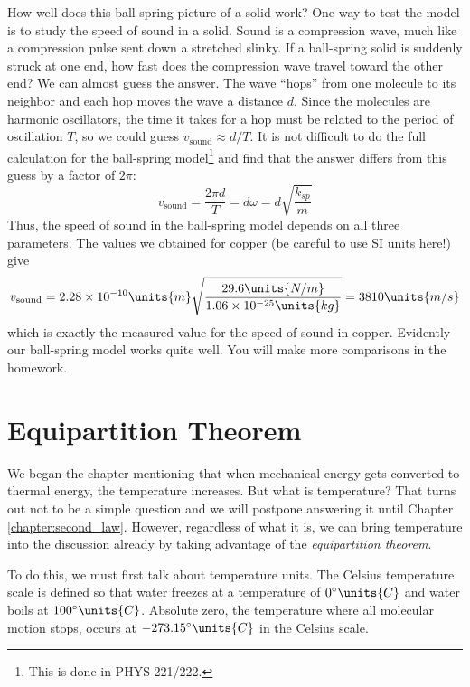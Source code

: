 How well does this ball-spring picture of a solid work? 
One way to test the model is to study the speed of sound in a
solid.  Sound is a compression wave, much like a compression pulse
sent down a stretched slinky.  If a ball-spring solid is suddenly
struck at one end, how fast does the compression wave travel toward
the other end?  We can almost guess the answer.  The wave ``hops''
from one molecule to its neighbor and each hop moves the wave a
distance $d$.  Since the molecules are harmonic oscillators, the time
it takes for a hop must be related to the period of oscillation $T$,
so we could guess $v_\text{sound} \approx d/T$.  It is not difficult
to do the full calculation for the ball-spring model\footnote{This is
  done in PHYS 221/222.} and find that the answer differs from this
guess by a factor of $2\pi$:
\begin{equation}
v_\text{sound} = \frac{2\pi d}{T} = d\omega  = d\sqrt{\frac{k_{sp}}{m}}
\end{equation}
Thus, the speed of sound in the ball-spring model depends on all three
parameters.  The values we obtained for copper (be careful to use SI
units here!) give
\begin{equation}
 v_\text{sound} = 2.28\times
 10^{-10}\units{m}\sqrt{\frac{29.6\units{N/m}}{1.06\times
     10^{-25}\units{kg}}} = 3810\units{m/s}
\end{equation}
which is exactly the measured value for the speed of sound in copper.
Evidently our ball-spring model works quite well.  You will make more
comparisons in the homework.

\section{Equipartition Theorem}

We began the chapter mentioning that when mechanical energy gets
converted to thermal energy, the temperature increases.  But what is
temperature?  That turns out not to be a simple question and we will
postpone answering it until Chapter \ref{chapter:second_law}.
However, regardless of what it is, we can bring temperature into the
discussion already by taking advantage of the {\it equipartition
  theorem}.

To do this, we must first talk about temperature units.  The Celsius
temperature scale is defined so that water freezes at a temperature of
$0^\circ\units{C}$ and water boils at $100^\circ\units{C}$.  Absolute
zero, the temperature where all molecular motion stops, occurs at
$-273.15^\circ\units{C}$ in the Celsius scale.  

